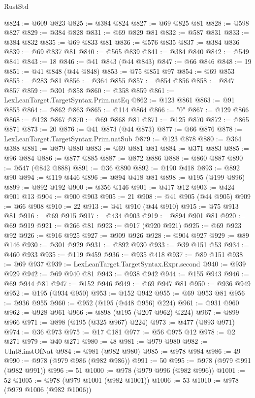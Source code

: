 \begin{lexlean}{RustStd}
\begin{coremodule}
{\begin{coremodule}
{{{{{{{{{{{{{{{{{{{{{{{{{{{{{{@824 := @609 @823
@825 := @384 @824
@827 := @69 @825 @81
@828 := @598 @827
@829 := @384 @828
@831 := @69 @829 @81
@832 := @587 @831
@833 := @384 @832
@835 := @69 @833 @81
@836 := @576 @835
@837 := @384 @836
@839 := @69 @837 @81
@840 := @565 @839
@841 := @384 @840
@842 := @549 @841
@843 := 18
@846 := @41 @843 (@44 @843)
@847 := @66 @846
@848 := 19
@851 := @41 @848 (@44 @848)
@853 := @75 @851 @97
@854 := @69 @853
@855 := @283 @81
@856 := @364 @855
@857 := @854 @856
@858 := @847 @857
@859 := @301 @858
@860 := @358 @859
@861 := LexLeanTarget.TargetSyntax.Prim.natEq
@862 := @123 @861
@863 := @91 @855
@864 := @862 @863
@865 := @114 @864
@866 := "0"
@867 := @129 @866
@868 := @128 @867
@870 := @69 @868 @81
@871 := @125 @870
@872 := @865 @871
@873 := 20
@876 := @41 @873 (@44 @873)
@877 := @66 @876
@878 := LexLeanTarget.TargetSyntax.Prim.natSub
@879 := @123 @878
@880 := @364 @388
@881 := @879 @880
@883 := @69 @881 @81
@884 := @371 @883
@885 := @96 @884
@886 := @877 @885
@887 := @872 @886
@888 := @860 @887
@890 := @547 (@842 @888)
@891 := @36 @890
@892 := @190 @418
@893 := @892 @90
@894 := @119 @446
@896 := @894 @418 @81
@898 := @195 (@199 @896)
@899 := @892 @192
@900 := @356 @146
@901 := @417 @12
@903 := @424 @901 @13
@904 := @900 @903
@905 := 21
@908 := @41 @905 (@44 @905)
@909 := @66 @908
@910 := 22
@913 := @41 @910 (@44 @910)
@915 := @75 @913 @81
@916 := @69 @915
@917 := @434 @903
@919 := @894 @901 @81
@920 := @69 @919
@921 := @266 @81
@923 := @917 (@920 @921)
@925 := @69 @923 @92
@926 := @916 @925
@927 := @909 @926
@928 := @904 @927
@929 := @89 @146
@930 := @301 @929
@931 := @892 @930
@933 := @39 @151 @53
@934 := @460 @933
@935 := @119 @459
@936 := @935 @418
@937 := @89 @151
@938 := @69 @937
@939 := LexLeanTarget.TargetSyntax.Expr.second
@940 := @939 @929
@942 := @69 @940 @81
@943 := @938 @942
@944 := @155 @943
@946 := @69 @944 @81
@947 := @152 @946
@949 := @69 @947 @81
@950 := @936 @949
@952 := @195 (@934 @950)
@953 := @152 @942
@955 := @69 @953 @81
@956 := @936 @955
@960 := @952 (@195 (@448 @956) @224)
@961 := @931 @960
@962 := @928 @961
@966 := @898 (@195 (@207 @962) @224)
@967 := @899 @966
@971 := @898 (@195 (@325 @967) @224)
@973 := @477 (@893 @971)
@974 := @36 @973
@975 := @17 @181
@977 := @56 @975 @12
@978 := @2 @271
@979 := @40 @271
@980 := 48
@981 := @979 @980
@982 := UInt8.instOfNat
@984 := @981 (@982 @980)
@985 := @978 @984
@986 := 49
@990 := @978 (@979 @986 (@982 @986))
@991 := 50
@995 := @978 (@979 @991 (@982 @991))
@996 := 51
@1000 := @978 (@979 @996 (@982 @996))
@1001 := 52
@1005 := @978 (@979 @1001 (@982 @1001))
@1006 := 53
@1010 := @978 (@979 @1006 (@982 @1006))
}}}}}}}}}}}}}}}}}}}}}}}}}}}}}}
\end{coremodule}}
\end{coremodule}
\end{lexlean}
